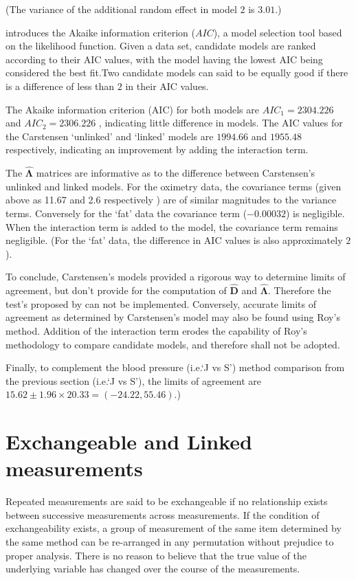 \documentclass[12pt, a4paper]{report}
\theoremstyle{plain}
\theoremstyle{definition}
\theoremstyle{remark}
\begin{document}
	\noindent (The variance of the additional random effect in model $2$ is $3.01$.)
	
	\citet{akaike} introduces the Akaike information criterion ($AIC$), a model 
	selection tool based on the likelihood function. Given a data set, candidate models
	are ranked according to their AIC values, with the model having the lowest AIC being considered the best fit.Two candidate models can said to be equally good if there is a difference of less than $2$ in their AIC values.
	
	The Akaike information criterion (AIC) for both models are $AIC_{1} = 2304.226$ and $AIC_{2} = 2306.226$ , indicating little difference in models. The AIC values for the Carstensen `unlinked' and `linked' models are $1994.66$ and $1955.48$ respectively, indicating an improvement by adding the interaction term.
	
	The $\boldsymbol{\hat{\Lambda}}$ matrices are informative as to the difference between Carstensen's unlinked and linked models. For the oximetry data, the covariance terms (given above as 11.67 and 2.6 respectively ) are of similar magnitudes to the variance terms. Conversely for the `fat' data the covariance term ($-0.00032$) is negligible. When the interaction term is added to the model, the covariance term remains negligible. (For the `fat' data, the difference in AIC values is also approximately $2$).
	
	To conclude, Carstensen's models provided a rigorous way to determine limits of agreement, but don't provide for the computation of $\boldsymbol{\hat{D}}$ and $\boldsymbol{\hat{\Lambda}}$. Therefore the test's proposed by \citet{roy} can not be implemented. Conversely, accurate limits of agreement as determined by Carstensen's model may also be found using Roy's method. Addition of the interaction term erodes the capability of Roy's methodology to compare candidate models, and therefore shall not be adopted.
	
	Finally, to complement the blood pressure (i.e.`J vs S') method comparison from the previous section (i.e.`J vs S'), the limits of agreement are $15.62 \pm 1.96 \times 20.33 = (-24.22, 55.46)$.)
	\newpage
	
	\section{Exchangeable and Linked measurements}
	
	
	Repeated measurements are said to be exchangeable if no relationship exists between successive measurements across measurements. If the condition of exchangeability exists, a group of measurement of the same item determined by the same method can be re-arranged in any permutation without prejudice to proper analysis. There is no reason to believe that the true value of the underlying variable has changed over the course of the measurements.
\end{document}
